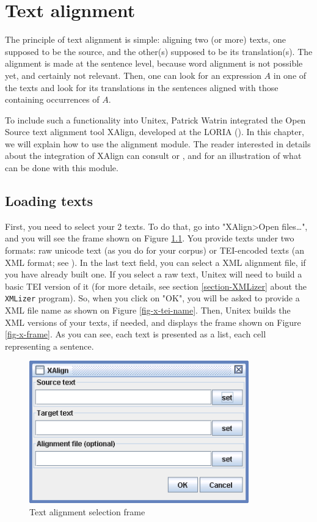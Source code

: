 \chapter{Text alignment}
\label{chap-alignment}
The principle of text alignment is simple: aligning two (or more) texts, one
supposed to be the source, and the other(s) supposed to be its translation(s). 
The alignment is made at the sentence level, because word alignment is not 
possible yet, and certainly not relevant. Then, one can look for an expression 
$A$ in one of the texts and look for its translations in the sentences aligned
with those containing occurrences of $A$.

\bigskip
\noindent To include such a functionality into Unitex, Patrick Watrin
integrated the Open Source text alignment tool XAlign, developed at the LORIA
(\cite{XAlign}). In this chapter, we will explain how to use the alignment
module. The reader interested in details about the integration of XAlign can
consult \cite{IGML_DumPau08} or \cite{IGML_PauDum08}, and \cite{dusko_xalign}
for an illustration of what can be done with this module.

\section{Loading texts}
First, you need to select your 2 texts. To do that, go into "XAlign>Open
files\ldots", and you will see the frame shown on Figure
\ref{fig-x-text-selection}. You provide texts under two formats: raw unicode
text (as you do for your corpus) or TEI-encoded texts (an XML format; see \cite{TEI}). In the last text field, 
you can select a XML alignment file, if you have already built one. If you
select a raw text, Unitex will need to build a basic TEI version of it (for
more details, see section \ref{section-XMLizer} about the \verb+XMLizer+
program). So, when you click on "OK", you will be asked to provide a XML file 
name as shown on Figure \ref{fig-x-tei-name}. Then, Unitex builds the XML
versions of your texts, if needed, and displays the frame shown on Figure
\ref{fig-x-frame}. As you can see, each text is presented as a list, each cell
representing a sentence.

\begin{figure}[!ht]
\begin{center}
\includegraphics[width=9.5cm]{resources/img/figX-1.png}
\caption{Text alignment selection frame\label{fig-x-text-selection}}
\end{center}
\end{figure}

